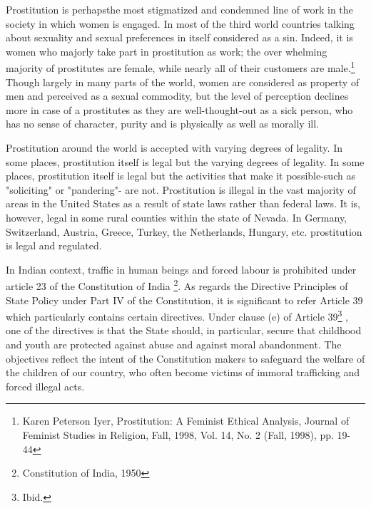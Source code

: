 \setcounter{figure}{0}
\setcounter{table}{0}
\setcounter{footnote}{0}


\begin{multicols}{2}


\noi
Prostitution is perhapsthe most stigmatized and condemned line of work in the society in which
women is engaged. In most of the third world countries talking about sexuality and sexual
preferences in itself considered as a sin. Indeed, it is women who majorly take part in
prostitution as work; the over whelming majority of prostitutes are female, while nearly all of
their customers are male.\footnote{Karen Peterson Iyer, Prostitution: A Feminist Ethical Analysis, Journal of Feminist Studies in Religion, Fall, 1998, Vol. 14, No. 2 (Fall, 1998), pp. 19-44} Though largely in many parts of the world, women are considered
as property of men and perceived as a sexual commodity, but the level of perception declines
more in case of a prostitutes as they are well-thought-out as a sick person, who has no sense of
character, purity and is physically as well as morally ill.

\noi
Prostitution around the world is accepted with varying degrees of legality. In some places,
prostitution itself is legal but the varying degrees of legality. In some places, prostitution itself
is legal but the activities that make it possible-such as "soliciting" or "pandering"- are not.
Prostitution is illegal in the vast majority of areas in the United States as a result of state laws
rather than federal laws. It is, however, legal in some rural counties within the state of Nevada.
In Germany, Switzerland, Austria, Greece, Turkey, the Netherlands, Hungary, etc. prostitution
is legal and regulated.

\noi
In Indian context, traffic in human beings and forced labour is prohibited under article 23 of
the Constitution of India \footnote{Constitution of India, 1950}. As regards the Directive Principles of State Policy under Part IV of
the Constitution, it is significant to refer Article 39 which particularly contains certain
directives. Under clause (e) of Article 39\footnote{Ibid.}
, one of the directives is that the State should, in
particular, secure that childhood and youth are protected against abuse and against moral
abandonment. The objectives reflect the intent of the Constitution makers to safeguard the
welfare of the children of our country, who often become victims of immoral trafficking and
forced illegal acts.


\end{multicols}

